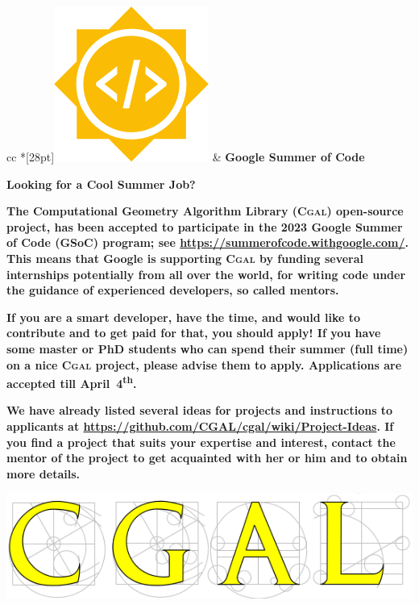 \documentclass[12pt,a4paper]{article}
\newcommand{\cgal}{\textsc{Cgal}}
\begin{document}
\begin{framed}
  \vspace{10pt}
  \newlength{\cgalwidth}\setlength{\cgalwidth}{\linewidth}
  \begin{tabular}{cc}
    *[28pt]{\includegraphics[width=0.1\cgalwidth]{../../images/og-image.png}} & {\fontsize{1.4cm}{1.4cm}\selectfont \textbf{Google Summer of Code}}
  \end{tabular}
  \begin{center}
    \textbf{\Huge Looking for a Cool Summer Job?}
  \end{center}
  \textbf{\large The Computational Geometry Algorithm Library
    (\cgal{}) open-source project, has been accepted to participate in
    the 2023 Google Summer of Code (GSoC) program; see
    \url{https://summerofcode.withgoogle.com/}.  This means that
    Google is supporting \cgal{} by funding several internships
    potentially from all over the world, for writing code under the
    guidance of experienced developers, so called mentors.}

  \textbf{{\large If you are a smart developer, have the time, and
    would like to contribute and to get paid for that, you should
    apply! If you have some master or PhD students who can spend their
    summer (full time) on a nice \cgal{} project, please advise them
    to apply.} Applications are accepted till April~4\textsuperscript{th}.}

  \textbf{\large We have already listed several ideas for projects and
    instructions to applicants at
    \url{https://github.com/CGAL/cgal/wiki/Project-Ideas}. If you find
    a project that suits your expertise and interest, contact the
    mentor of the project to get acquainted with her or him and to
    obtain more details.}

  \centering\includegraphics[width=\cgalwidth]{../../images/cgal_front_page_2013.png}
\end{framed}
\end{document}
